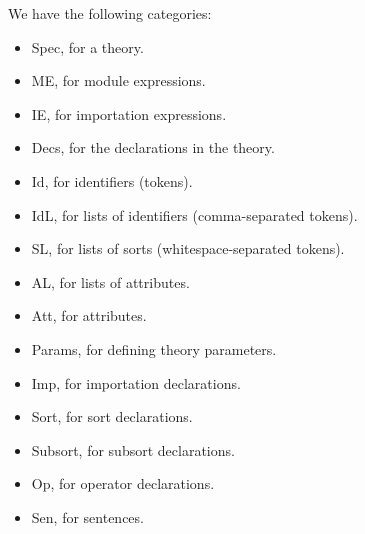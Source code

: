 We have the following categories:
\begin{itemize}
\item
Spec, for a theory.

\item
ME, for module expressions.

\item
IE, for importation expressions.

\item
Decs, for the declarations in the theory.

\item
Id, for identifiers (tokens).

\item
IdL, for lists of identifiers (comma-separated tokens).

\item
SL, for lists of sorts (whitespace-separated tokens).

\item
AL, for lists of attributes.

\item
Att, for attributes.

\item
Params, for defining theory parameters.

\item
Imp, for importation declarations.

\item
Sort, for sort declarations.

\item
Subsort, for subsort declarations.

\item
Op, for operator declarations.

\item
Sen, for sentences.
\end{itemize}



















